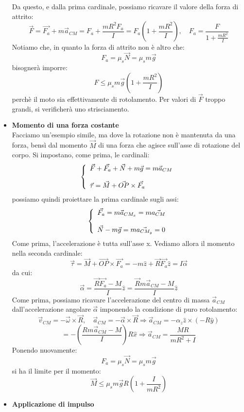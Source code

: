 \documentclass[a4paper,12pt]{article}
\begin{document}
\begin{itemize}
    Da questo, e dalla prima cardinale, possiamo ricavare il valore della forza di attrito:
    $$ \vec{F} = \vec{F_a}+ m\vec{a}_{CM} = F_a + \frac{mR^2F_a}{I} = F_a\left( 1 + \frac{mR^2}{I} \right), \quad F_a = \frac{F}{1 + \frac{mR^2}{I}}$$
    Notiamo che, in quanto la forza di attrito non è altro che:
    $$ F_a = \mu_s \vec{N} = \mu_s m\vec{g}$$
    bisognerà imporre:
    $$ F \leq \mu_s m\vec{g}\left(1 + \frac{mR^2}{I} \right)$$
    perchè il moto sia effettivamente di rotolamento. Per valori di $\vec{F}$ troppo grandi, si verificherà uno strisciamento.
  \item \textbf{Momento di una forza costante} \\
    Facciamo un'esempio simile, ma dove la rotazione non è mantenuta da una forza, bensì dal momento $\vec{M}$ di una forza che agisce sull'asse di rotazione del corpo. Si impostano, come prima, le cardinali:
    $$ 
    \left\{\begin{array}{l}
        \vec{F} + \vec{F_a} + \vec{N} + m \vec{g} = m\vec{a}_{CM} \cr \\
        \vec{\tau} = \vec{M} + \vec{OP} \times \vec{F_a}
    \end{array}\right.
    $$
    possiamo quindi proiettare la prima cardinale sugli assi:
    $$ 
    \left\{\begin{array}{l}
        \vec{F_a} = m\vec{a}_{CM_x} = m\vec{a_{CM}}  \cr \\ 
        \vec{N} - m\vec{g} = m\vec{a_{CM_y}} = 0
    \end{array}\right.
    $$
    Come prima, l'accelerazione è tutta sull'asse x. Vediamo allora il momento nella seconda cardinale:
    $$ \vec{\tau} = \vec{M} + \vec{OP} \times \vec{F_a} = -m\hat{z} + \vec{R}\vec{F_a}\hat{z} = I\vec{\alpha} $$
    da cui:
    $$ \vec{\alpha} = \frac{\vec{R}\vec{F_a} - M}{I}\hat{z} = \frac{\vec{R}m\vec{a}_{CM} - M}{I}\hat{z} $$
    Come prima, possiamo ricavare l'accelerazione del centro di massa $\vec{a}_{CM}$ dall'accelerazione angolare $\vec{\alpha}$ imponendo la condizione di puro rotolamento:
    $$ \vec{v}_{CM} = -\vec{\omega} \times \vec{R}, \quad \vec{a}_{CM} = -\vec{\alpha} \times \vec{R} \Rightarrow \vec{a}_{CM} = -\alpha_z\hat{z} \times (-R\hat{y})$$
    $$ = -\left( \frac{Rm\vec{a}_{CM} - M}{I}  \right)R\hat{x} \Rightarrow \vec{a}_{CM} = \frac{MR}{mR^2 + I}  $$
    Ponendo nuovamente:
    $$ F_a = \mu_s \vec{N} = \mu_s m\vec{g}$$
    si ha il limite per il momento:
    $$ \vec{M} \leq \mu_s m\vec{g}R \left( 1 + \frac{I}{mR^2} \right) $$
\item \textbf{Applicazione di impulso} \\

\end{itemize}
\end{document}
